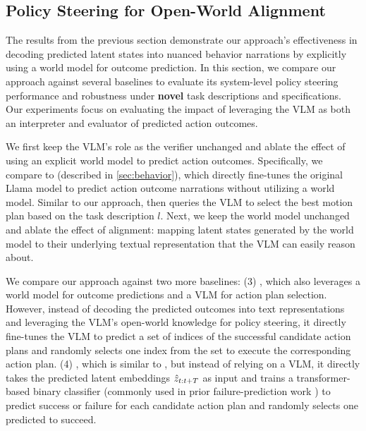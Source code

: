 \subsection{Policy Steering for Open-World Alignment}
\label{sec:steering}


The results from the previous section demonstrate our approach's effectiveness in decoding predicted latent states into nuanced behavior narrations by explicitly using a world model for outcome prediction.
In this section, we compare our approach against several baselines to evaluate its system-level policy steering performance and robustness under \textbf{novel} task descriptions and specifications. Our experiments focus on evaluating the impact of leveraging the VLM as both an interpreter and evaluator of predicted action outcomes.



We first keep the VLM’s role as the verifier unchanged and ablate the effect of using an explicit world model to predict action outcomes. Specifically, we compare \ours to \vlmact (described in \autoref{sec:behavior}), which directly fine-tunes the original Llama model to predict action outcome narrations without utilizing a world model. Similar to our approach, \vlmact then queries the VLM to select the best motion plan based on the task description $l$.
Next, we keep the world model unchanged and ablate the effect of alignment: mapping latent states generated by the world model to their underlying textual representation that the VLM can easily reason about.

We compare our approach against two more baselines: (3) \vlmdynlatentcat, which also leverages a world model for outcome predictions and a VLM for action plan selection. However, instead of decoding the predicted outcomes into text representations and leveraging the VLM's open-world knowledge for policy steering, it directly fine-tunes the VLM to predict a set of indices of the successful candidate action plans and randomly selects one index from the set to execute the corresponding action plan.
(4) \classdynlatent, which is similar to \vlmdynlatentcat, but instead of relying on a VLM, it directly takes the predicted latent embeddings $\hat{z}_{t:t+T}$ as input and trains a transformer-based binary classifier (commonly used in prior failure-prediction work \citep{liumulti}) to predict success or failure for each candidate action plan and randomly selects one predicted to succeed.









